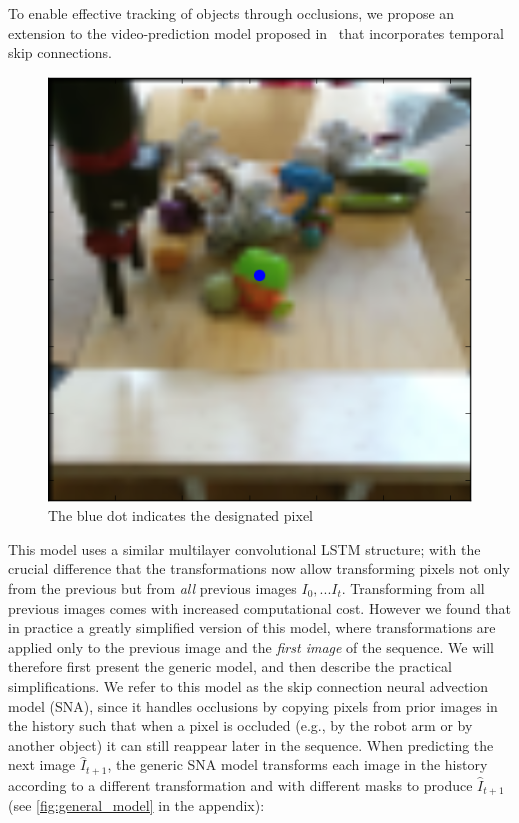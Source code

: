\label{sec:occlusion_model}
To enable effective tracking of objects through occlusions, we propose an extension to the video-prediction model proposed in~\cite{finn_nips} that incorporates temporal skip connections. 
\begin{figure}
        \centering
        \includegraphics[width=0.4\columnwidth]{images_sna/occlusionaware/img_desigpixb0.png}
        \caption{The blue dot indicates the designated pixel}
        \label{fig:desig_pix_bluedot}
\end{figure}
This model uses a similar multilayer convolutional LSTM structure; with the crucial difference that the transformations now allow transforming pixels not only from the previous but from \emph{all} previous images $I_0,...I_{t}$. Transforming from all previous images comes with increased computational cost. However we found that in practice a greatly simplified version of this model, where transformations are applied only to the previous image and the \emph{first image} of the sequence. We will therefore first present the generic model, and then describe the practical simplifications. We refer to this model as the skip connection neural advection model (SNA), since it handles occlusions by copying pixels from prior images in the history such that when a pixel is occluded (e.g., by the robot arm or by another object) it can still reappear later in the sequence. When predicting the next image $\hat{I}_{t+1}$, the generic SNA model transforms each image in the history according to a different transformation and with different masks to produce $\hat{I}_{t+1}$ (see \autoref{fig:general_model} in the appendix):


